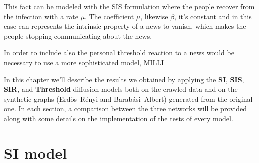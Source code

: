 This fact can be modeled with the SIS formulation where the people recover from the infection with a rate $\mu$.
The coefficient $\mu$, likewise $\beta$, it's constant and in this case can represents the intrinsic property of a news to vanish,
which makes the people stopping communicating about the news.




In order to include also the personal threshold reaction to a news would be necessary to use a more sophisticated model, MILLI

In this chapter we'll describe the results we obtained by applying the \textbf{SI}, \textbf{SIS}, \textbf{SIR},
and \textbf{Threshold} diffusion models both on the crawled data and on the synthetic graphs (Erdős–Rényi and
Barabási–Albert) generated from the original one. In each section, a comparison between the three networks will be
provided along with some details on the implementation of the tests of every model.


\section{SI model} %
\label{sec:si_model}


